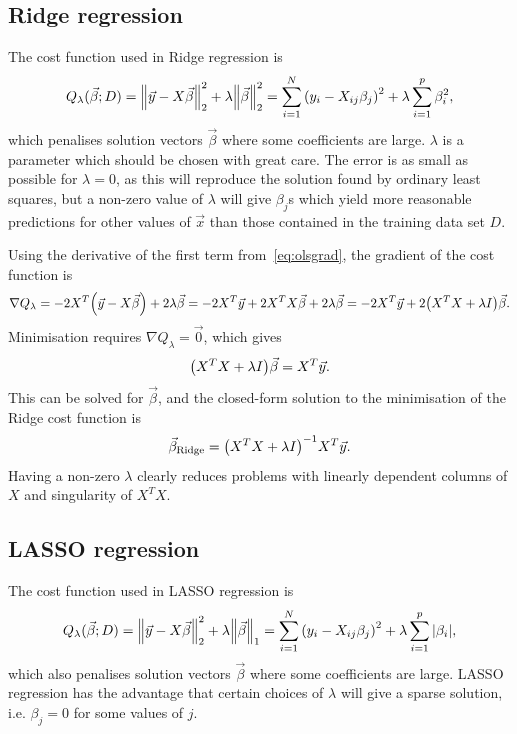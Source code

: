 \documentclass[11pt,british,a4paper]{article}
\numberwithin{equation}{section}
\begin{document}
\subsection{Ridge regression}
The cost function used in Ridge regression is
\begin{equation}
    Q_\lambda(\vec{\beta};D) = \norm{\vec{y}-X\vec{\beta}}_2^2 + \lambda \norm{\vec{\beta}}_2^2
                             = \sum_{i=1}^N \qty(y_i - X_{ij}\beta_j)^2 + \lambda\sum_{i=1}^p \beta_i^2,
\end{equation}
which penalises solution vectors \(\vec{\beta}\) where some coefficients are large.
\(\lambda\) is a parameter which should be chosen with great care.
The error is as small as possible for \(\lambda=0\), as this will reproduce the solution found by ordinary least squares, but a non-zero value of \(\lambda\) will give \(\beta_j\)s which yield more reasonable predictions for other values of \(\vec{x}\) than those contained in the training data set \(D\)\cite{mehta}.

Using the derivative of the first term from~\vref{eq:olsgrad}, the gradient of the cost function is
\begin{equation}
    \nabla Q_\lambda = -2 X^T \qty(\vec{y}-X\vec{\beta}) + 2\lambda \vec{\beta}
                     = -2 X^T \vec{y} + 2 X^T X \vec{\beta} + 2\lambda \vec{\beta}
                     = -2 X^T \vec{y} + 2\qty(X^T X + \lambda I)\vec{\beta}.
\end{equation}
Minimisation requires \(\nabla Q_\lambda = \vec{0}\), which gives
\begin{equation}
    \qty(X^T X + \lambda I)\vec{\beta} = X^T \vec{y}.
\end{equation}
This can be solved for \(\vec{\beta}\), and the closed-form solution to the minimisation of the Ridge cost function is
\begin{equation}
    \vec{\beta}_\text{Ridge} = \qty(X^T X + \lambda I)^{-1} X^T \vec{y}.
\end{equation}
Having a non-zero \(\lambda\) clearly reduces problems with linearly dependent columns of \(X\) and singularity of \(X^T X\).

\tikzexternaldisable
\subsection{LASSO regression}
The cost function used in LASSO regression is
\begin{equation}
    Q_\lambda(\vec{\beta};D) = \norm{\vec{y}-X\vec{\beta}}_2^2 + \lambda \norm{\vec{\beta}}_1
                             = \sum_{i=1}^N \qty(y_i - X_{ij}\beta_j)^2 + \lambda\sum_{i=1}^p \abs{\beta_i},
\end{equation}
which also penalises solution vectors \(\vec{\beta}\) where some coefficients are large.
LASSO regression has the advantage that certain choices of \(\lambda\) will give a sparse solution, i.e. \(\beta_j=0\) for some values of \(j\)\cite{wieringen}.
\end{document}
